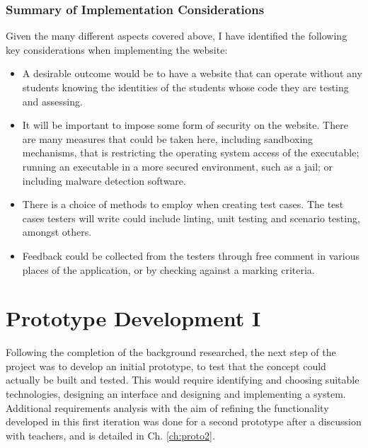 \documentclass[a4paper,11pt]{report}
\begin{document}
\subsection{Summary of Implementation Considerations}
Given the many different aspects covered above, I have identified the following key considerations when implementing the website:
\begin{itemize}
 \item A desirable outcome would be to have a website that can operate without any students knowing the identities of the students whose code they are testing and assessing.
 \item It will be important to impose some form of security on the website. There are many measures that could be taken here, including sandboxing mechanisms, that is restricting the operating system access of the executable; running an executable in a more secured environment, such as a jail; or including malware detection software.
 \item There is a choice of methods to employ when creating test cases. The test cases testers will write could include linting, unit testing and scenario testing, amongst others.
 \item Feedback could be collected from the testers through free comment in various places of the application, or by checking against a marking criteria.
\end{itemize}


\chapter{Prototype Development I}
\label{ch:proto1}
Following the completion of the background researched, the next step of the project was to develop an initial prototype, to test that the concept could actually be built and tested. This would require identifying and choosing suitable technologies, designing an interface and designing and implementing a system. Additional requirements analysis with the aim of refining the functionality developed in this first iteration was done for a second prototype after a discussion with teachers, and is detailed in Ch. \ref{ch:proto2}.
\end{document}
